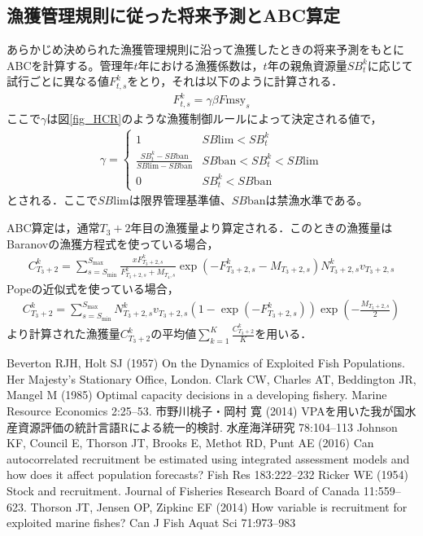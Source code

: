 \documentclass[11pt]{jsarticle}
\begin{document}
\subsection{漁獲管理規則に従った将来予測とABC算定}
あらかじめ決められた漁獲管理規則に沿って漁獲したときの将来予測をもとにABCを計算する。管理年$t$年における漁獲係数は，$t$年の親魚資源量$SB_t^k$に応じて試行ごとに異なる値$F_{t,s}^k$をとり，それは以下のように計算される．
\begin{eqnarray}
  F_{t, s}^k=\gamma \beta F\mathrm{msy}_s
\end{eqnarray}
ここで$\gamma$は図\ref{fig_HCR}のような漁獲制御ルールによって決定される値で，
\begin{eqnarray}
  \gamma =
  \begin{cases}
    1   &  SB\mathrm{lim} < SB_t^k \\
    \frac{SB_t^k-SB\mathrm{ban}}{SB\mathrm{lim} -SB\mathrm{ban}}  & SB\mathrm{ban} < SB_t^k< SB\mathrm{lim} \\
    0 & SB_t^k < SB\mathrm{ban}
  \end{cases}
\end{eqnarray}
とされる．ここで$SB\mathrm{lim}$は限界管理基準値、$SB\mathrm{ban}$は禁漁水準である。

ABC算定は，通常$T_{3}+2$年目の漁獲量より算定される．このときの漁獲量はBaranovの漁獲方程式を使っている場合，
\begin{eqnarray}
  C_{T_3+2}^k=\sum_{s=S_{\mathrm{min}}}^{S_{\mathrm{max}}} \frac{x F_{T_3+2,s}^k}{F_{T_3+2,s}^k+M_{T_4,s}}
  \exp(- F_{T_3+2,s}^k-M_{T_3+2,s}) N_{T_3+2,s}^k v_{T_3+2,s}
\end{eqnarray}
Popeの近似式を使っている場合，
\begin{eqnarray}
  C_{T_3+2}^k=\sum_{s=S_{\mathrm{min}}}^{S_{\mathrm{max}}} N_{T_3+2,s}^k v_{T_3+2,s} (1-\exp(- F_{T_3+2,s}^k)) \exp(-\frac{M_{T_3+2, s}}{2})
\end{eqnarray}
より計算された漁獲量$C_{T_3+2}^k$の平均値$\sum_{k=1}^K \frac{C_{T_3+2}^k}{K}$を用いる．

\begin{thebibliography}{9}
 Beverton RJH, Holt SJ (1957) On the Dynamics of Exploited Fish Populations. Her Majesty’s Stationary Office, London.
 Clark CW, Charles AT, Beddington JR, Mangel M (1985) Optimal capacity decisions in a developing fishery. Marine Resource Economics 2:25--53.
 市野川桃子・岡村 寛 (2014) VPAを用いた我が国水産資源評価の統計言語Rによる統一的検討. 水産海洋研究 78:104--113
 Johnson KF, Council E, Thorson JT, Brooks E, Methot RD, Punt AE (2016) Can autocorrelated recruitment be estimated using integrated assessment models and how does it affect population forecasts? Fish Res 183:222--232
 Ricker WE (1954) Stock and recruitment. Journal of Fisheries Research Board of Canada 11:559--623.
 Thorson JT, Jensen OP, Zipkinc EF (2014) How variable is recruitment for exploited marine fishes? Can J Fish Aquat Sci 71:973--983

\end{thebibliography}
\end{document}
